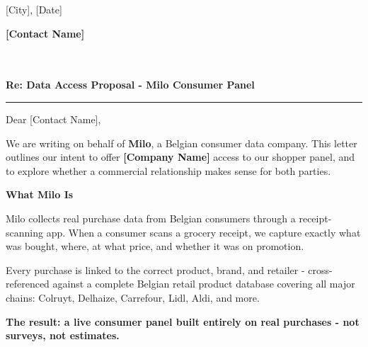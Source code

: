 \documentclass[11pt,a4paper]{article}
\begin{document}

\vspace*{0.3cm}

\begin{flushright}
  {\small\textcolor{milogray}{[City], [Date]}}
\end{flushright}

\vspace{4pt}

{\small
\textbf{[Contact Name]}\\
[Title]\\
[Company Name]\\
[Address]
}

\vspace{16pt}

\textcolor{milonavy}{\textbf{Re: Data Access Proposal - Milo Consumer Panel}}

\vspace{4pt}
\textcolor{milodivider}{\rule{\linewidth}{0.8pt}}
\vspace{10pt}

Dear [Contact Name],

We are writing on behalf of \textbf{Milo}, a Belgian consumer data company. This letter outlines our intent to offer \textbf{[Company Name]} access to our shopper panel, and to explore whether a commercial relationship makes sense for both parties.

\vspace{8pt}
{\large\textbf{\textcolor{milonavy}{What Milo Is}}}
\vspace{2pt}

Milo collects real purchase data from Belgian consumers through a receipt-scanning app. When a consumer scans a grocery receipt, we capture exactly what was bought, where, at what price, and whether it was on promotion.

Every purchase is linked to the correct product, brand, and retailer - cross-referenced against a complete Belgian retail product database covering all major chains: Colruyt, Delhaize, Carrefour, Lidl, Aldi, and more.

\vspace{4pt}
\noindent\colorbox{milolight}{%
  \parbox{\dimexpr\linewidth-2\fboxsep\relax}{%
    \vspace{5pt}
    \textcolor{milonavy}{\textbf{The result: a live consumer panel built entirely on real purchases - not surveys, not estimates.}}
    \vspace{5pt}
  }%
}
\end{document}
